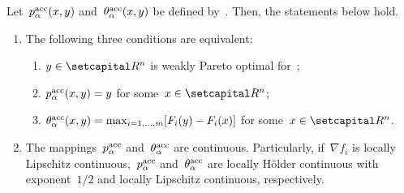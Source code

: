 \documentclass[../main]{subfiles}
\begin{document}
\begin{proposition} 
    Let~$p^{\mathrm{acc}}_\alpha(x, y)$ and~$\theta^{\mathrm{acc}}_\alpha(x, y)$ be defined by~.
    Then, the statements below hold.
    \begin{enumerate}
        \item The following three conditions are equivalent: 
            \begin{enumerate}
                \item $y \in \setR^n$ is weakly Pareto optimal for~; 
                \item $p^{\mathrm{acc}}_\alpha(x, y) = y$ for some~$x \in \setR^n$; 
                \item $\theta^{\mathrm{acc}}_\alpha(x, y) = \max_{i = 1, \dots, m} [ F_i(y) - F_i(x) ]$ for some~$x \in \setR^n$. 
            \end{enumerate}
        \item The mappings~$p^{\mathrm{acc}}_\alpha$ and~$\theta^{\mathrm{acc}}_\alpha$ are continuous.
            Particularly, if~$\nabla f_i$ is locally Lipschitz continuous,~$p^{\mathrm{acc}}_\alpha$ and~$\theta^{\mathrm{acc}}_\alpha$ are locally H\"older continuous with exponent~$1 / 2$ and locally Lipschitz continuous, respectively. 
    \end{enumerate}
\end{proposition}
\end{document}
